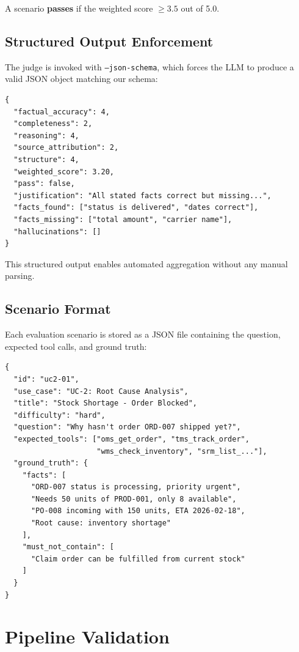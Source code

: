 \documentclass[11pt,a4paper]{article}
\begin{document}
A scenario \textbf{passes} if the weighted score $\geq 3.5$ out of 5.0.

\subsection{Structured Output Enforcement}

The judge is invoked with \texttt{--json-schema}, which forces the LLM to produce a valid JSON object matching our schema:

\begin{lstlisting}
{
  "factual_accuracy": 4,
  "completeness": 2,
  "reasoning": 4,
  "source_attribution": 2,
  "structure": 4,
  "weighted_score": 3.20,
  "pass": false,
  "justification": "All stated facts correct but missing...",
  "facts_found": ["status is delivered", "dates correct"],
  "facts_missing": ["total amount", "carrier name"],
  "hallucinations": []
}
\end{lstlisting}

This structured output enables automated aggregation without any manual parsing.

\subsection{Scenario Format}

Each evaluation scenario is stored as a JSON file containing the question, expected tool calls, and ground truth:

\begin{lstlisting}
{
  "id": "uc2-01",
  "use_case": "UC-2: Root Cause Analysis",
  "title": "Stock Shortage - Order Blocked",
  "difficulty": "hard",
  "question": "Why hasn't order ORD-007 shipped yet?",
  "expected_tools": ["oms_get_order", "tms_track_order",
                     "wms_check_inventory", "srm_list_..."],
  "ground_truth": {
    "facts": [
      "ORD-007 status is processing, priority urgent",
      "Needs 50 units of PROD-001, only 8 available",
      "PO-008 incoming with 150 units, ETA 2026-02-18",
      "Root cause: inventory shortage"
    ],
    "must_not_contain": [
      "Claim order can be fulfilled from current stock"
    ]
  }
}
\end{lstlisting}

\section{Pipeline Validation}
\end{document}
